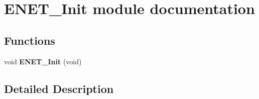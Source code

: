 \hypertarget{group___e_n_e_t___init__module}{}\section{E\+N\+E\+T\+\_\+\+Init module documentation}
\label{group___e_n_e_t___init__module}
\subsection*{Functions}
\begin{DoxyCompactItemize}
\item 
void {\bfseries E\+N\+E\+T\+\_\+\+Init} (void)\hypertarget{group___e_n_e_t___init__module_gae7571bb8d10075e3e114c3f29e51802b}{}\label{group___e_n_e_t___init__module_gae7571bb8d10075e3e114c3f29e51802b}

\end{DoxyCompactItemize}


\subsection{Detailed Description}
